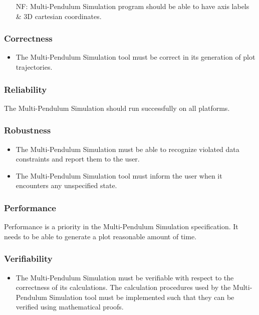 \documentclass[12pt]{article}
\newcounter{reqnum} %
\newcounter{nfreqnum} %
\newcommand{\progname}{Multi-Pendulum Simulation }
\begin{document}
\begin{itemize}
\item[NF\refstepcounter{nfreqnum}\thenfreqnum:] \progname program should be able to have axis
labels \& 3D cartesian coordinates.
\end{itemize}

\subsubsection*{Correctness}
\begin{itemize}
	\item The \progname tool must be correct in its generation of plot trajectories.
\end{itemize}

\subsubsection*{Reliability}

The \progname should run successfully on all platforms.

\subsubsection*{Robustness}
\begin{itemize}
	\item The \progname must be able to recognize violated data 
	constraints and report them to the user.
	\item The \progname tool must inform the user when it encounters any 
	unspecified state.
\end{itemize}

\subsubsection*{Performance}
Performance is a priority in the \progname
specification. It needs to be able to generate a plot reasonable amount of time.

\subsubsection*{Verifiability}
\begin{itemize}
	\item The \progname must be verifiable with respect to the 
	correctness of its calculations. The calculation 
	procedures used by the \progname tool must be implemented such that 
	they can be verified using mathematical proofs.
\end{itemize}
\end{document}
